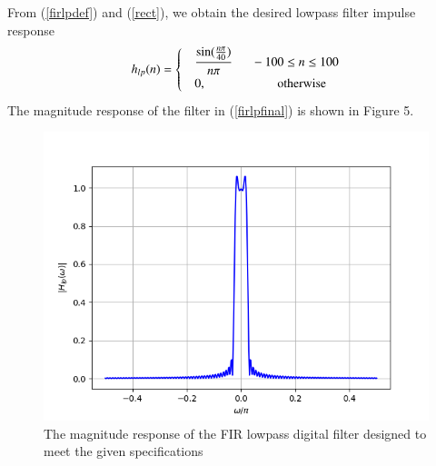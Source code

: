 \documentclass[article]{IEEEtran}
\theoremstyle{remark}
\numberwithin{equation}{subsection}
\begin{document}
From (\ref{firlpdef}) and (\ref{rect}), we obtain the desired lowpass filter impulse response
\begin{align}
h_{lp}(n) =
\begin{cases}
\label{firlpfinal}
& \dfrac{\sin(\frac{n\pi}{40})}{n\pi} \indent -100 \leq n \leq 100  \\
& 0, \hspace{2cm} \mbox{otherwise}
\end{cases}
\end{align}
The magnitude  response of the filter in (\ref{firlpfinal}) is shown in Figure 5.

\begin{figure}[H]
\label{fig5}
\includegraphics[width = \columnwidth]{figs/fig5.png}
\caption{The magnitude response of the FIR lowpass digital filter designed to meet the given specifications} 
\end{figure}
\end{document}
